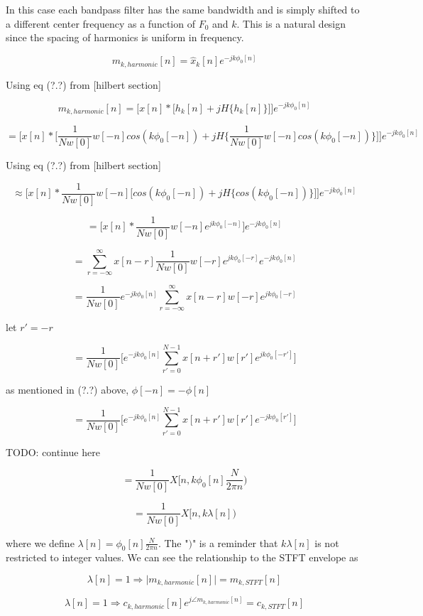 \documentclass [11pt, proquest] {uwthesis}[2015/03/03]
\begin{document}
In this case each bandpass filter has the same bandwidth and is simply shifted to a different center frequency as a function of $F_0$ and $k$.  This is a natural design since the spacing of harmonics is uniform in frequency.


$$m_{k,harmonic}[n] = \widehat{x}_k[n] e^{-jk \phi_0[n]}$$

Using eq (?.?) from [hilbert section]

$$m_{k,harmonic}[n] =  \Bigg[ x[n] * \Big[ h_k[n]+  jH\{h_k[n]\} \Big] \Bigg] e^{-jk \phi_0[n]}$$

$$=  \Bigg[ x[n] * \Big[ \frac{1}{Nw[0]} w[-n] cos( k \phi_0[-n]) +  jH\{\frac{1}{Nw[0]} w[-n] cos( k \phi_0[-n])\} \Big] \Bigg] e^{-jk \phi_0[n]}$$

Using eq (?.?) from [hilbert section]

$$\approx  \Bigg[ x[n] *  \frac{1}{Nw[0]} w[-n] \Big[cos( k \phi_0[-n]) +  jH\{cos( k \phi_0[-n])\} \Big] \Bigg] e^{-jk \phi_0[n]}$$

$$=  \Bigg[ x[n] *  \frac{1}{Nw[0]} w[-n] e^{jk \phi_0[-n]} \Bigg] e^{-jk \phi_0[n]}$$

$$= \sum_{r = -\infty}^\infty x[n - r] \frac{1}{Nw[0]}w[-r] e^{jk \phi_0[-r]} e^{-jk \phi_0[n]}$$

$$=  \frac{1}{Nw[0]} e^{-jk \phi_0[n]} \sum_{r = -\infty}^\infty x[n - r] w[-r] e^{jk \phi_0[-r]}$$

let $r' = -r$

$$= \frac{1}{Nw[0]} \bigg[ e^{-jk \phi_0[n]} \sum_{r' = 0}^{N-1} x[n + r'] w[r'] e^{jk \phi_0[-r']} \bigg]$$

as mentioned in (?.?) above, $\phi[-n] = -\phi[n]$

$$= \frac{1}{Nw[0]} \bigg[ e^{-jk \phi_0[n]} \sum_{r' = 0}^{N-1} x[n + r'] w[r'] e^{-jk \phi_0[r']} \bigg]$$

TODO: continue here


$$= \frac{1}{Nw[0]} X[n, k \phi_0[n] \frac{N}{2\pi n})$$

$$= \frac{1}{Nw[0]} X[n, k\lambda[n])$$

where we define $\lambda[n] = \phi_0[n] \frac{N}{2\pi n}$.  The "$)$" is a reminder that $k\lambda [n]$ is not restricted to integer values.  We can see the relationship to the STFT envelope as

$$\lambda[n] = 1 \Rightarrow \vert m_{k,harmonic}[n] \vert = m_{k,STFT}[n]$$

$$\lambda[n] = 1 \Rightarrow c_{k,harmonic}[n]e^{j \angle m_{k,harmonic}[n]} = c_{k,STFT}[n]$$
\end{document}
